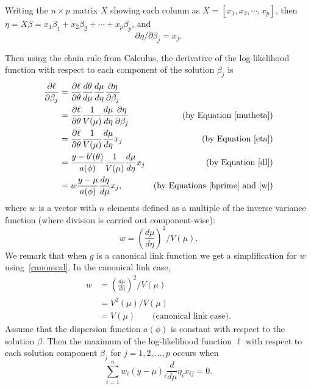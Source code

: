 \documentclass[10pt]{article} %
\begin{document}
Writing the $n \times p$ matrix $X$ showing each column as
$X = [x_1, x_2, \cdots, x_p]$, then
$\eta = X\beta = x_1\beta_1 + x_2\beta_2 + \cdots + x_p\beta_p$,
and 
\begin{equation}\label{eta}
\partial\eta/\partial\beta_j = x_j.
\end{equation}

Then using the chain rule from Calculus, the derivative of the log-likelihood
function with respect to each component of the solution $\beta_j$ is
\begin{align}
\frac{\partial\ell}{\partial\beta_j}
&= \frac{\partial\ell}{\partial\theta}\frac{d\theta}{d\mu}\frac{d\mu}{d\eta}\frac{\partial\eta}{\partial\beta_j} \nonumber\\
&= \frac{\partial\ell}{\partial\theta}\frac{1}{V(\mu)}\frac{d\mu}{d\eta}\frac{\partial\eta}{\partial\beta_j} 
    &\mbox{(by Equation \ref{mutheta})} \nonumber\\
&= \frac{\partial\ell}{\partial\theta}\frac{1}{V(\mu)}\frac{d\mu}{d\eta}x_j
    &\mbox{(by Equation \ref{eta})} \nonumber\\
&= \frac{y- b'(\theta)}{a(\phi)}\frac{1}{V(\mu)}\frac{d\mu}{d\eta}x_j
    &\mbox{(by Equation \ref{dl})} \nonumber\\
&= w\frac{y-\mu}{a(\phi)}\frac{d\eta}{d\mu}x_j,
    &\mbox{(by Equations \ref{bprime} and \ref{w})} \label{dldb}
\end{align}
where $w$ is a vector with $n$ elements defined as a multiple of the inverse variance function
(where division is carried out component-wise):
\begin{equation}\label{w}
w = \left(\frac{d\mu}{d\eta}\right)^2 \bigg/ V(\mu).
\end{equation}
We remark that when $g$ is a canonical link function we get a simplification
for $w$ using~\ref{canonical}. In the canonical link case,
\begin{align}
w &= \left(\frac{d\mu}{d\eta}\right)^2 \bigg/ V(\mu) \nonumber \\
&= V^2(\mu) / V(\mu) \nonumber \\
&= V(\mu)\qquad\mbox{(canonical link case)}.  \label{W_canonical}
\end{align}
Assume that the dispersion function $a(\phi)$ is constant with respect to the
solution $\beta$. Then the maximum of the log-likelihood function $\ell$ with
respect to each solution component $\beta_j$ for $j=1, 2, \ldots, p$ occurs when
\begin{equation}\label{max_loglik}
\sum_{i=1}^n w_i(y-\mu)_i\frac{d}{d\mu}\eta_ix_{ij} = 0.
\end{equation}
\end{document}
